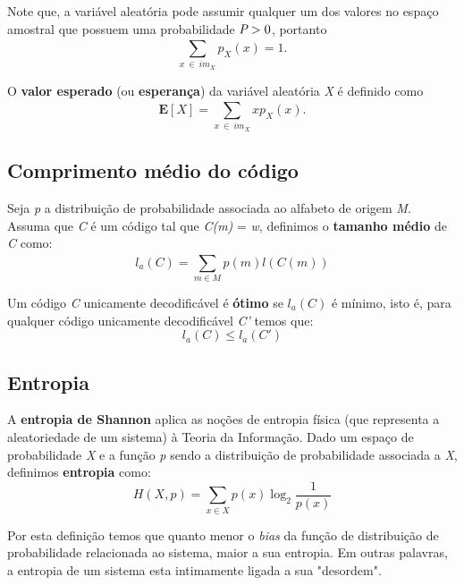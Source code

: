 Note que, a variável aleatória pode assumir qualquer um dos valores no espaço amostral que possuem uma probabilidade $\emph{P} > 0$, portanto
\begin{equation} \label{eq:dist_prob_sum}
\sum_{x ~\in ~im_X}^{}p_X(x) = 1.
\end{equation}

O \textbf{valor esperado} (ou \textbf{esperança}) da variável aleatória \emph{X} é definido como
\begin{equation} \label{eq:exp_val}
\textbf{E}[X] = \sum_{x ~\in ~im_X}^{} xp_X(x).
\end{equation}
\subsection{Comprimento médio do código}
Seja \emph{p} a distribuição de probabilidade associada ao alfabeto de origem \emph{M}. Assuma que \emph{C} é um código tal que \emph{C(m)} = \emph{w}, definimos o \textbf{tamanho médio} de \emph{C} como:
\begin{equation} \label{eq:code_len}
l_a (C) = \sum_{m \in M}^{} p(m) l(C(m))
\end{equation}

Um código \emph{C} unicamente decodificável é \textbf{ótimo} se $l_a(C)$ é mínimo, isto é, para qualquer código unicamente decodificável \emph{C'} temos que:
\begin{equation} \label{eq:code_len_optimal}
l_a(C) \leq l_a(C')
\end{equation}

\subsection{Entropia}
A \textbf{entropia de Shannon} aplica as noções de entropia física (que representa a aleatoriedade de um sistema) à Teoria da Informação. Dado um espaço de probabilidade \emph{X} e a função \emph{p} sendo a distribuição de probabilidade associada a \emph{X}, definimos \textbf{entropia} como:
\begin{equation} \label{eq:entropy}
H(X, p) = \sum_{x \in X}^{} p(x) \log_2 \frac{1}{p(x)}
\end{equation}

Por esta definição temos que quanto menor o \emph{bias} da função de distribuição de probabilidade relacionada ao sistema, maior a sua entropia. Em outras palavras, a entropia de um sistema esta intimamente ligada a sua  "desordem". 

